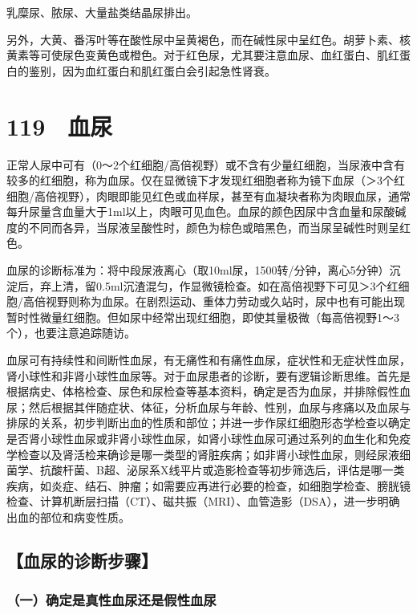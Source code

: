乳糜尿、脓尿、大量盐类结晶尿排出。

另外，大黄、番泻叶等在酸性尿中呈黄褐色，而在碱性尿中呈红色。胡萝卜素、核黄素等可使尿色变黄色或橙色。对于红色尿，尤其要注意血尿、血红蛋白、肌红蛋白的鉴别，因为血红蛋白和肌红蛋白会引起急性肾衰。

\protect\hypertarget{text00276.html}{}{}

\section{119　血尿}

正常人尿中可有（0～2个红细胞/高倍视野）或不含有少量红细胞，当尿液中含有较多的红细胞，称为血尿。仅在显微镜下才发现红细胞者称为镜下血尿（＞3个红细胞/高倍视野），肉眼即能见红色或血样尿，甚至有血凝块者称为肉眼血尿，通常每升尿量含血量大于1ml以上，肉眼可见血色。血尿的颜色因尿中含血量和尿酸碱度的不同而各异，当尿液呈酸性时，颜色为棕色或暗黑色，而当尿呈碱性时则呈红色。

血尿的诊断标准为：将中段尿液离心（取10ml尿，1500转/分钟，离心5分钟）沉淀后，弃上清，留0.5ml沉渣混匀，作显微镜检查。如在高倍视野下可见＞3个红细胞/高倍视野则称为血尿。在剧烈运动、重体力劳动或久站时，尿中也有可能出现暂时性微量红细胞。但如尿中经常出现红细胞，即使其量极微（每高倍视野1～3个），也要注意追踪随访。

血尿可有持续性和间断性血尿，有无痛性和有痛性血尿，症状性和无症状性血尿，肾小球性和非肾小球性血尿等。对于血尿患者的诊断，要有逻辑诊断思维。首先是根据病史、体格检查、尿色和尿检查等基本资料，确定是否为血尿，并排除假性血尿；然后根据其伴随症状、体征，分析血尿与年龄、性别，血尿与疼痛以及血尿与排尿的关系，初步判断出血的性质和部位；并进一步作尿红细胞形态学检查以确定是否肾小球性血尿或非肾小球性血尿，如肾小球性血尿可通过系列的血生化和免疫学检查以及肾活检来确诊是哪一类型的肾脏疾病；如非肾小球性血尿，则经尿液细菌学、抗酸杆菌、B超、泌尿系X线平片或造影检查等初步筛选后，评估是哪一类疾病，如炎症、结石、肿瘤；如需要应再进行必要的检查，如细胞学检查、膀胱镜检查、计算机断层扫描（CT）、磁共振（MRI）、血管造影（DSA），进一步明确出血的部位和病变性质。

\subsection{【血尿的诊断步骤】}

\subsubsection{（一）确定是真性血尿还是假性血尿}


